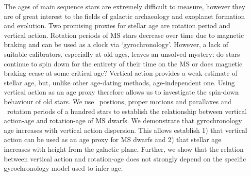 The ages of main sequence stars are extremely difficult to measure, however
they are of great interest to the fields of galactic archaeology and exoplanet
formation and evolution.
Two promising proxies for stellar age are rotation period and vertical action.
Rotation periods of MS stars decrease over time due to magnetic braking and
can be used as a clock via `gyrochronology'.
However, a lack of suitable calibrators, especially at old ages, leaves an
unsolved mystery: do stars continue to spin down for the entirety of their
time on the MS or does magnetic braking cease at some critical age?
Vertical action provides a weak estimate of stellar age, but, unlike other
age-dating methods, age-independent one.
Using vertical action as an age proxy therefore allows us to investigate the
spin-down behaviour of old stars.
We use \Gaia\ postions, proper motions and parallaxes and \Kepler\ rotation
periods of a hundred stars to establish the relationship between vertical
action-age and rotation-age of MS dwarfs.
We demonstrate that gyrochronology age increases with vertical action
dispersion.
This allows establish 1) that vertical action can be used as an age
proxy for MS dwarfs and 2) that stellar age increases with height from the
galactic plane.
Further, we show that the relation between vertical action and rotation-age
does not strongly depend on the specific gyrochronology model used to infer
age.


